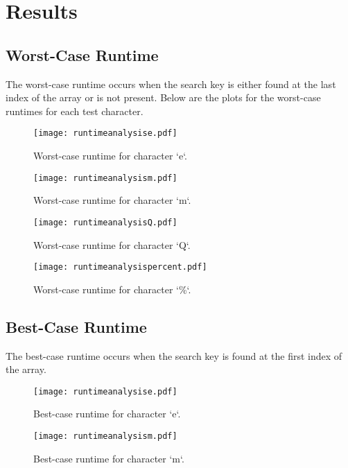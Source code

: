 \documentclass{article}
\begin{document}
	\newpage
	
	\section{Results}
	
	\subsection{Worst-Case Runtime}
	The worst-case runtime occurs when the search key is either found at the last index of the array or is not present. Below are the plots for the worst-case runtimes for each test character.
	
	\begin{figure}[H]
		\centering
		\texttt{[image: runtimeanalysise.pdf]}
		\caption{Worst-case runtime for character `e`.}
	\end{figure}
	
	\begin{figure}[H]
		\centering
		\texttt{[image: runtimeanalysism.pdf]}
		\caption{Worst-case runtime for character `m`.}
	\end{figure}
	
	\begin{figure}[H]
		\centering
		\texttt{[image: runtimeanalysisQ.pdf]}
		\caption{Worst-case runtime for character `Q`.}
	\end{figure}
	
	\begin{figure}[H]
		\centering
		\texttt{[image: runtimeanalysispercent.pdf]}
		\caption{Worst-case runtime for character `\%`.}
	\end{figure}
	
	\subsection{Best-Case Runtime}
	The best-case runtime occurs when the search key is found at the first index of the array.
	
	\begin{figure}[H]
		\centering
		\texttt{[image: runtimeanalysise.pdf]}
		\caption{Best-case runtime for character `e`.}
	\end{figure}
	
	\begin{figure}[H]
		\centering
		\texttt{[image: runtimeanalysism.pdf]}
		\caption{Best-case runtime for character `m`.}
	\end{figure}
	
\end{document}

